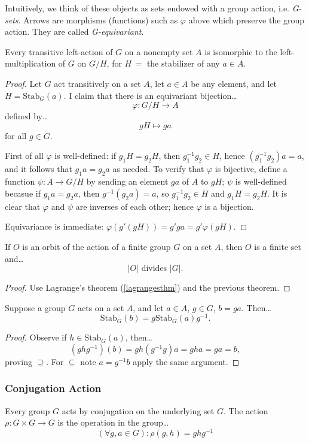 \begin{figure}[H]
\centering

\end{figure}

\noindent Intuitively, we think of these objects as sets endowed with a group action, i.e. \emph{G-sets}. Arrows are morphisms (functions) such as $\varphi$
above which preserve the group action. They are called \emph{G-equivariant}.

\begin{proposition}
Every transitive left-action of $G$ on a nonempty set $A$ is isomorphic to the left-multiplication of $G$ on $G/H$, for $H \, =$ the stabilizer
of any $a \in A$.
\end{proposition}

\begin{proof}
Let $G$ act transitively on a set $A$, let $a \in A$ be any element, and let $H = \textrm{Stab}_G(a)$. I claim that there is an equivariant bijection\dots
$$\varphi : G/H \rightarrow A$$
defined by\dots
$$gH \mapsto ga$$
for all $g \in G$.

First of all $\varphi$ is well-defined: if $g_1H =g_2H$, then $g_1^{-1}g_2 \in H$, hence $(g_1^{-1}g_2)a = a$, and it follows that $g_1a = g_2a$ as needed.
To verify that $\varphi$ is bijective, define a function $\psi : A \rightarrow G/H$ by sending an element $ga$ of $A$ to $gH$; $\psi$ is well-defined becasue if $g_1a = g_2a$,
then $g^{-1}(g_2a) = a$, so $g_1^{-1}g_2 \in H$ and $g_1H = g_2H$. It is clear that $\varphi$ and $\psi$ are inverses of each other; hence $\varphi$ is a bijection.

Equivariance is immediate: $\varphi(g'(gH)) = g'ga = g' \varphi(gH).$
\end{proof}

\begin{corollary}
If $O$ is an orbit of the action of a finite group $G$ on a set $A$, then $O$ is a finite set and\dots
$$|O| \textrm{ divides } |G|.$$
\end{corollary}

\begin{proof}
Use Lagrange's theorem (\ref{lagrangesthm}) and the previous theorem.
\end{proof}

\begin{proposition}
Suppose a group $G$ acts on a set $A$, and let $a \in A$, $g \in G$, $b = ga$. Then\dots
$$\textrm{Stab}_G(b) = g\textrm{Stab}_G(a)g^{-1}.$$
\end{proposition}

\begin{proof}
Observe if $h \in \textrm{Stab}_G(a)$, then\dots
$$(ghg^{-1})(b) = gh(g^{-1}g)a = gha = ga = b,$$
proving $\supseteq$. For $\subseteq$ note $a = g^{-1}b$ apply the same argument.
\end{proof}

\subsubsection{Conjugation Action}\label{conjugationgroupaction}
Every group $G$ acts by conjugation on the underlying set $G$. The action $\rho : G \times G \rightarrow G$ is
the operation in the group\dots
$$(\forall g,a \in G): \rho(g,h) = ghg^{-1}$$